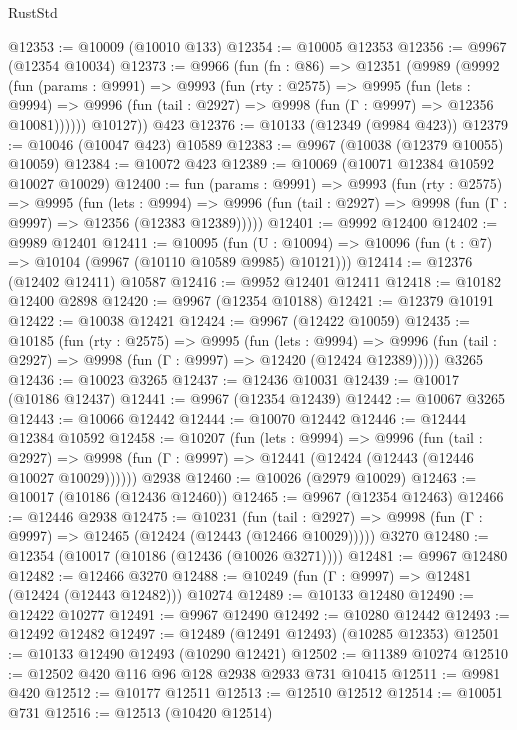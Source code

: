 \begin{lexlean}{RustStd}
\begin{coremodule}
@12353 := @10009 (@10010 @133)
@12354 := @10005 @12353
@12356 := @9967 (@12354 @10034)
@12373 := @9966
    (fun (fn : @86) =>
    @12351
      (@9989
        (@9992
          (fun (params : @9991) =>
          @9993
            (fun (rty : @2575) =>
            @9995
              (fun (lets : @9994) =>
              @9996 (fun (tail : @2927) => @9998 (fun (Γ : @9997) => @12356 @10081))))))
        @10127))
    @423
@12376 := @10133 (@12349 (@9984 @423))
@12379 := @10046 (@10047 @423) @10589
@12383 := @9967 (@10038 (@12379 @10055) @10059)
@12384 := @10072 @423
@12389 := @10069 (@10071 @12384 @10592 @10027 @10029)
@12400 := fun (params : @9991) =>
  @9993
    (fun (rty : @2575) =>
    @9995
      (fun (lets : @9994) =>
      @9996 (fun (tail : @2927) => @9998 (fun (Γ : @9997) => @12356 (@12383 @12389)))))
@12401 := @9992 @12400
@12402 := @9989 @12401
@12411 := @10095
    (fun (U : @10094) => @10096 (fun (t : @7) => @10104 (@9967 (@10110 @10589 @9985) @10121)))
@12414 := @12376 (@12402 @12411) @10587
@12416 := @9952 @12401 @12411
@12418 := @10182 @12400 @2898
@12420 := @9967 (@12354 @10188)
@12421 := @12379 @10191
@12422 := @10038 @12421
@12424 := @9967 (@12422 @10059)
@12435 := @10185
    (fun (rty : @2575) =>
    @9995
      (fun (lets : @9994) =>
      @9996 (fun (tail : @2927) => @9998 (fun (Γ : @9997) => @12420 (@12424 @12389)))))
    @3265
@12436 := @10023 @3265
@12437 := @12436 @10031
@12439 := @10017 (@10186 @12437)
@12441 := @9967 (@12354 @12439)
@12442 := @10067 @3265
@12443 := @10066 @12442
@12444 := @10070 @12442
@12446 := @12444 @12384 @10592
@12458 := @10207
    (fun (lets : @9994) =>
    @9996
      (fun (tail : @2927) =>
      @9998 (fun (Γ : @9997) => @12441 (@12424 (@12443 (@12446 @10027 @10029))))))
    @2938
@12460 := @10026 (@2979 @10029)
@12463 := @10017 (@10186 (@12436 @12460))
@12465 := @9967 (@12354 @12463)
@12466 := @12446 @2938
@12475 := @10231
    (fun (tail : @2927) => @9998 (fun (Γ : @9997) => @12465 (@12424 (@12443 (@12466 @10029)))))
    @3270
@12480 := @12354 (@10017 (@10186 (@12436 (@10026 @3271))))
@12481 := @9967 @12480
@12482 := @12466 @3270
@12488 := @10249 (fun (Γ : @9997) => @12481 (@12424 (@12443 @12482))) @10274
@12489 := @10133 @12480
@12490 := @12422 @10277
@12491 := @9967 @12490
@12492 := @10280 @12442
@12493 := @12492 @12482
@12497 := @12489 (@12491 @12493) (@10285 @12353)
@12501 := @10133 @12490 @12493 (@10290 @12421)
@12502 := @11389 @10274
@12510 := @12502 @420 @116 @96 @128 @2938 @2933 @731 @10415
@12511 := @9981 @420
@12512 := @10177 @12511
@12513 := @12510 @12512
@12514 := @10051 @731
@12516 := @12513 (@10420 @12514)

\end{coremodule}
\end{lexlean}
